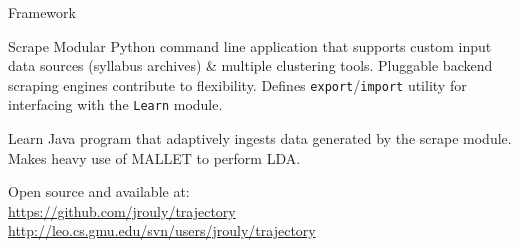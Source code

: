 \begin{frame}{Framework}

  \begin{block}{Scrape}
    Modular Python command line application that supports custom input
    data sources (syllabus archives) \& multiple clustering tools.
    Pluggable backend scraping engines contribute to flexibility. Defines
    \texttt{export}/\texttt{import} utility for interfacing with the
    \texttt{Learn} module.
  \end{block}

  \vfill

  \begin{block}{Learn}
    Java program that adaptively ingests data generated by the scrape
    module. Makes heavy use of MALLET to perform LDA.
  \end{block}

  \vfill

  Open source and available at:\\
  \url{https://github.com/jrouly/trajectory}\\
  \url{http://leo.cs.gmu.edu/svn/users/jrouly/trajectory}

\end{frame}
